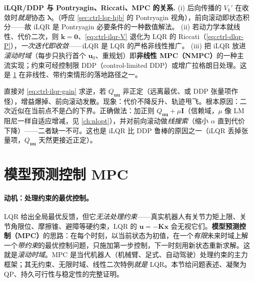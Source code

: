 \begin{note}
\textbf{iLQR/DDP 与 Pontryagin、Riccati、MPC 的关系.}\;
(i) 后向传播的 $V_k'$ 在收敛时\emph{就是}协态 $\boldsymbol{\lambda}_k$（呼应 \cref{sec:ctrl-lqr-hjb} 的 Pontryagin 视角），前向滚动即状态积分——故 iLQR 是 Pontryagin 必要条件的一种数值解法。
(ii) 若动力学本就线性、代价二次，则 $\mathbf{k}=\mathbf{0}$、\cref{eq:ctrl-ilqr-V} 退化为 LQR 的 Riccati（\cref{eq:ctrl-dlqr-P}），\emph{一次迭代即收敛}——iLQR 是 LQR 的严格非线性推广。
(iii) 把 iLQR 放进\emph{滚动时域}（每步只执行首个 $\mathbf{u}_0$、重规划）即\textbf{非线性 MPC（NMPC）}的一种主流实现；约束可经控制限 DDP（control-limited DDP）或增广拉格朗日处理。这是 \cref{sec:ctrl-mpc} 在非线性、带约束情形的落地路径之一。
\end{note}

\begin{pitfall}
直接对 \cref{eq:ctrl-ilqr-gain} 求逆，若 $Q_{\mathbf{u}\mathbf{u}}$ 非正定（远离最优、或 DDP 张量项作怪），增益爆掉、前向滚动发散。现象：代价不降反升、轨迹甩飞。根本原因：二次近似在当前点不是凸的下界。正确做法：加正则 $Q_{\mathbf{u}\mathbf{u}}+\mu\mathbf{I}$（信赖域，$\mu$ 像 LM 阻尼一样自适应增减，见 \cref{ch:nlopt}），并对前向滚动做\emph{线搜索}（缩小 $\alpha$ 直到代价下降）——二者缺一不可。这也是 iLQR 比 DDP 鲁棒的原因之一（iLQR 丢掉张量项，$Q_{\mathbf{u}\mathbf{u}}$ 天然更接近正定）。
\end{pitfall}

\section{模型预测控制 MPC}
\label{sec:ctrl-mpc}

\paragraph{动机：处理约束的最优控制。}
LQR 给出全局最优反馈，但它\emph{无法处理约束}——真实机器人有关节力矩上限、关节角限位、摩擦锥、避障等硬约束，LQR 的 $\mathbf{u}=-\mathbf{K}\mathbf{x}$ 会无视它们。\textbf{模型预测控制（MPC）}的思路：在每个时刻，以当前状态为初值，在一个\emph{有限}未来时域上解一个\emph{带约束}的最优控制问题，只施加第一步控制，下一时刻用新状态重新求解。这就是\emph{滚动时域}。MPC 是当代机器人（机械臂、足式、自动驾驶）处理约束的主力框架；其无约束、无限时域、线性二次特例\emph{就是} LQR。本节给问题表述、凝聚为 QP、持久可行性与稳定性的完整证明。


